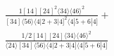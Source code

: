 \documentclass[varwidth, border=5pt]{standalone}
\begin{document}
\begin{my}
$\begin{gathered}
\scriptscriptstyle\frac{1[14][24]^2⟨34⟩⟨46⟩^2}{[34]⟨56⟩⟨4|2+3|4]^2⟨4|5+6|4]}+\\
\scriptscriptstyle\frac{1/2[14][24]⟨34⟩⟨46⟩^2}{⟨24⟩[34]⟨56⟩⟨4|2+3|4]⟨4|5+6|4]}\phantom{+}
\end{gathered}$
\end{my}
\end{document}
